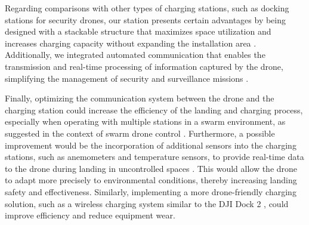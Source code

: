 Regarding comparisons with other types of charging stations, such as docking stations for security drones, our station presents certain advantages by being designed with a stackable structure that maximizes space utilization and increases charging capacity without expanding the installation area \cite{grlj_docking_stations}. Additionally, we integrated automated communication that enables the transmission and real-time processing of information captured by the drone, simplifying the management of security and surveillance missions \cite{nieuwoudt2023}.

Finally, optimizing the communication system between the drone and the charging station could increase the efficiency of the landing and charging process, especially when operating with multiple stations in a swarm environment, as suggested in the context of swarm drone control \cite{marek2023}. Furthermore, a possible improvement would be the incorporation of additional sensors into the charging stations, such as anemometers and temperature sensors, to provide real-time data to the drone during landing in uncontrolled spaces \cite{bene2023, nieuwoudt2023}. This would allow the drone to adapt more precisely to environmental conditions, thereby increasing landing safety and effectiveness. Similarly, implementing a more drone-friendly charging solution, such as a wireless charging system similar to the DJI Dock 2 \cite{nieuwoudt2023}, could improve efficiency and reduce equipment wear.


